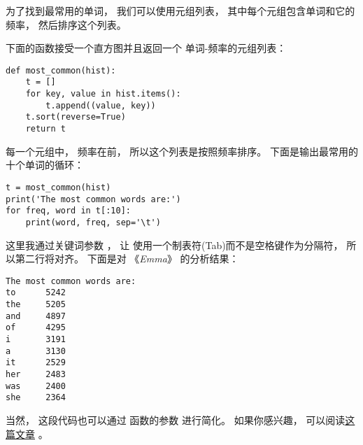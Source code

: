 
为了找到最常用的单词， 我们可以使用元组列表， 其中每个元组包含单词和它的频率， 然后排序这个列表。

下面的函数接受一个直方图并且返回一个
单词-频率的元组列表：

\begin{lstlisting}
def most_common(hist):
    t = []
    for key, value in hist.items():
        t.append((value, key))
    t.sort(reverse=True)
    return t
\end{lstlisting}


每一个元组中， 频率在前， 所以这个列表是按照频率排序。
下面是输出最常用的十个单词的循环：

\begin{lstlisting}
t = most_common(hist)
print('The most common words are:')
for freq, word in t[:10]:
    print(word, freq, sep='\t')
\end{lstlisting}


这里我通过关键词参数 ，  让  使用一个制表符(Tab)而不是空格键作为分隔符，  所以第二行将对齐。    下面是对 《{\em Emma}》 的分析结果：

\begin{lstlisting}
The most common words are:
to      5242
the     5205
and     4897
of      4295
i       3191
a       3130
it      2529
her     2483
was     2400
she     2364
\end{lstlisting}


当然， 这段代码也可以通过  函数的参数  进行简化。
如果你感兴趣， 可以阅读\href{https://wiki.python.org/moin/HowTo/Sorting}{这篇文章} 。

